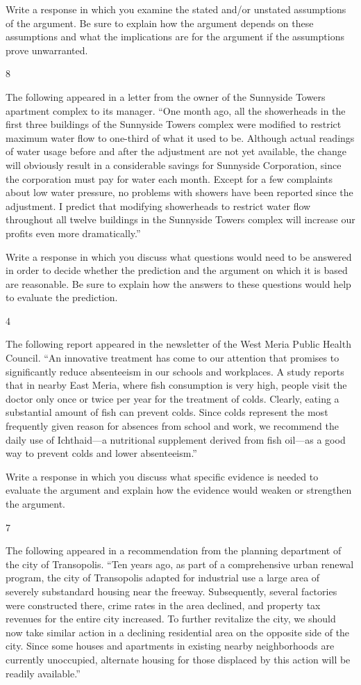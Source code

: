\documentclass[]{article}
\begin{document}
Write a response in which you examine the stated and/or unstated
assumptions of the argument. Be sure to explain how the argument depends
on these assumptions and what the implications are for the argument if
the assumptions prove unwarranted.

8

The following appeared in a letter from the owner of the Sunnyside
Towers apartment complex to its manager. ``One month ago, all the
showerheads in the first three buildings of the Sunnyside Towers complex
were modified to restrict maximum water flow to one-third of what it
used to be. Although actual readings of water usage before and after the
adjustment are not yet available, the change will obviously result in a
considerable savings for Sunnyside Corporation, since the corporation
must pay for water each month. Except for a few complaints about low
water pressure, no problems with showers have been reported since the
adjustment. I predict that modifying showerheads to restrict water flow
throughout all twelve buildings in the Sunnyside Towers complex will
increase our profits even more dramatically.''

Write a response in which you discuss what questions would need to be
answered in order to decide whether the prediction and the argument on
which it is based are reasonable. Be sure to explain how the answers to
these questions would help to evaluate the prediction.

4

The following report appeared in the newsletter of the West Meria Public
Health Council. ``An innovative treatment has come to our attention that
promises to significantly reduce absenteeism in our schools and
workplaces. A study reports that in nearby East Meria, where fish
consumption is very high, people visit the doctor only once or twice per
year for the treatment of colds. Clearly, eating a substantial amount of
fish can prevent colds. Since colds represent the most frequently given
reason for absences from school and work, we recommend the daily use of
Ichthaid---a nutritional supplement derived from fish oil---as a good
way to prevent colds and lower absenteeism.''

Write a response in which you discuss what specific evidence is needed
to evaluate the argument and explain how the evidence would weaken or
strengthen the argument.

7

The following appeared in a recommendation from the planning department
of the city of Transopolis. ``Ten years ago, as part of a comprehensive
urban renewal program, the city of Transopolis adapted for industrial
use a large area of severely substandard housing near the freeway.
Subsequently, several factories were constructed there, crime rates in
the area declined, and property tax revenues for the entire city
increased. To further revitalize the city, we should now take similar
action in a declining residential area on the opposite side of the city.
Since some houses and apartments in existing nearby neighborhoods are
currently unoccupied, alternate housing for those displaced by this
action will be readily available.''
\end{document}
